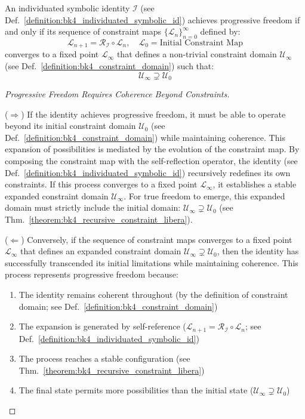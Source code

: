 \begin{theorem} 
\label{theorem:bk4_recursive_constraint_libera}
An individuated symbolic identity $\mathcal{I}$ (see Def.~\ref{definition:bk4_individuated_symbolic_id}) achieves progressive freedom if and only if its sequence of constraint maps $\{\mathcal{L}_n\}_{n=0}^{\infty}$ defined by:
\begin{equation}
    \mathcal{L}_{n+1} = \mathcal{R}_{\mathcal{I}} \circ \mathcal{L}_n, \quad \mathcal{L}_0 = \text{Initial Constraint Map}
\end{equation}
converges to a fixed point $\mathcal{L}_{\infty}$ that defines a non-trivial constraint domain $\mathcal{U}_{\infty}$ (see Def.~\ref{definition:bk4_constraint_domain}) such that:
\begin{equation}
    \mathcal{U}_{\infty} \supsetneq \mathcal{U}_0
\end{equation}
\end{theorem}

\begin{proof}[Progressive Freedom Requires Coherence Beyond Constraints]
\label{proof:bk4_progressive_freedom_constraint_expansion}

($\Rightarrow$) If the identity achieves progressive freedom, it must be able to operate beyond its initial constraint domain $\mathcal{U}_0$ (see Def.~\ref{definition:bk4_constraint_domain}) while maintaining coherence. This expansion of possibilities is mediated by the evolution of the constraint map.
By composing the constraint map with the self-reflection operator, the identity (see Def.~\ref{definition:bk4_individuated_symbolic_id}) recursively redefines its own constraints. If this process converges to a fixed point $\mathcal{L}_{\infty}$, it establishes a stable expanded constraint domain $\mathcal{U}_{\infty}$.
For true freedom to emerge, this expanded domain must strictly include the initial domain: $\mathcal{U}_{\infty} \supsetneq \mathcal{U}_0$ (see Thm.~\ref{theorem:bk4_recursive_constraint_libera}).

($\Leftarrow$) Conversely, if the sequence of constraint maps converges to a fixed point $\mathcal{L}_{\infty}$ that defines an expanded constraint domain $\mathcal{U}_{\infty} \supsetneq \mathcal{U}_0$, then the identity has successfully transcended its initial limitations while maintaining coherence.
This process represents progressive freedom because:
\begin{enumerate}
    \item The identity remains coherent throughout (by the definition of constraint domain; see Def.~\ref{definition:bk4_constraint_domain})
    \item The expansion is generated by self-reference ($\mathcal{L}_{n+1} = \mathcal{R}_{\mathcal{I}} \circ \mathcal{L}_n$; see Def.~\ref{definition:bk4_individuated_symbolic_id})
    \item The process reaches a stable configuration (see Thm.~\ref{theorem:bk4_recursive_constraint_libera})
    \item The final state permits more possibilities than the initial state ($\mathcal{U}_{\infty} \supsetneq \mathcal{U}_0$)
\end{enumerate}
\end{proof}

